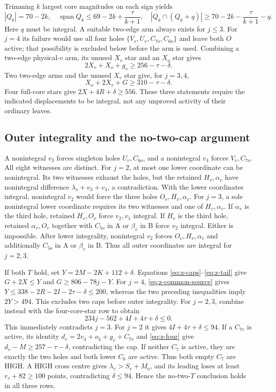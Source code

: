 \documentclass[11pt,letterpaper]{article}
\theoremstyle{definition}\newtheorem{definition}[theorem]{Definition}
\begin{document}
Trimming $k$ largest core magnitudes on each sign yields
\[
 |Q_k|=70-2k,\quad\operatorname{span}Q_k\le69-2k+\frac{\tau}{k+1},\quad
 |Q_k\cap(Q_k+q)|\ge70-2k-\frac{\tau}{k+1}-q.
\]
Here $q$ must be integral. A suitable two-edge arm always exists for $j\le3$. For $j=4$ its failure would use all four holes $\{V_v,U_v,C_{7o},C_{6o}\}$ and leave both $O$ active; that possibility is excluded below before the arm is used. Combining a two-edge physical-$v$ arm, its unused $X_v$ star and an $X_o$ star gives
\begin{equation}\label{eq:z-four}2X_v+X_o+g_v\ge256-\tau-\delta.\end{equation}
Two two-edge arms and the unused $X_v$ star give, for $j=3,4$,
\begin{equation}\label{eq:z-five}X_o+2X_v+G\ge310-\tau-\delta.\end{equation}
Four full-core stars give $2X+4R+\delta\ge556$. These three statements require the indicated displacements to be integral, not any unproved activity of their ordinary leaves.

\subsection{Outer integrality and the no-two-cap argument}
A nonintegral $v_3$ forces singleton holes $U_v,C_{6o}$, and a nonintegral $v_4$ forces $V_v,C_{7o}$. All eight witnesses are distinct.
For $j=2$, at most one lower coordinate can be nonintegral. Its two witnesses exhaust the holes, but the retained $H_v,\alpha_v$ have nonintegral difference $\lambda_v+v_3+v_4$, a contradiction. With the lower coordinates integral, nonintegral $v_2$ would force the three holes $O_v,H_v,\alpha_v$.
For $j=3$, a sole nonintegral lower coordinate requires its two witnesses and one of $H_v,\alpha_v$. If $\alpha_v$ is the third hole, retained $H_v,O_v$ force $v_2,v_1$ integral. If $H_v$ is the third hole, retained $\alpha_v,O_v$ together with $C_{5o}$ in A or $\beta_v$ in B force $v_2$ integral. Either is impossible. After lower integrality, nonintegral $v_2$ forces $O_v,H_v,\alpha_v$ and additionally $C_{5o}$ in A or $\beta_v$ in B. Thus all outer coordinates are integral for $j=2,3$.

If both $T$ hold, set $Y=2M-2K+112+\delta$. Equations \eqref{eq:z-caps}--\eqref{eq:z-tail} give $G+2X\le Y$ and $G\ge806-78j-Y$.
For $j=4$, \eqref{eq:z-common-source} gives $Y\le338-2R-2I-2\tau-\delta\le200$, whereas the two preceding inequalities imply $2Y>494$. This excludes two caps before outer integrality.
For $j=2,3$, combine instead with the four-core-star row to obtain
\[
 234j-562+4I+4\tau+\delta\le0.
\]
This immediately contradicts $j=3$. For $j=2$ it gives $4I+4\tau+\delta\le94$. If a $C_{7v}$ is active, its identity $d_v=2v_4+o_4+g_v+C_{7v}$ and \eqref{eq:z-four} give $d_v-M\ge257-\tau-\delta$, contradicting the cap. If neither $C_7$ is active, they are exactly the two holes and both lower $C_6$ are active. Thus both empty $C_7$ are HIGH. A HIGH cross centre gives $\lambda_v>S_v+M_o$, and its leading loses at least $r_v+82\ge100$ points, contradicting $\delta\le94$. Hence the no-two-$T$ conclusion holds in all three rows.
\end{document}
